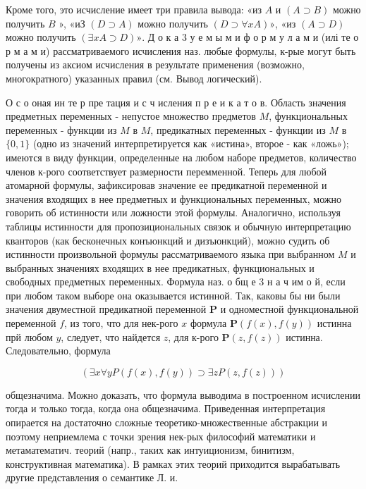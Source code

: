 \documentclass[10pt]{article}
\begin{document}
Кроме того, это исчисление имеет три правила вывода: «из $A$ и $(A \supset B)$ можно получить $B$ », «иЗ $(D \supset A)$ можно получить $(D \supset \forall x A) »$, «из $(A \supset D)$ можно получить $(\exists x A \supset D) »$. Д о к а 3 у е м ы м и ф о р м у л а м и (илі те о р м а м и) рассматриваемого исчисления наз. любые формулы, к-рые могут быть получены из аксиом исчисления в результате применения (возможно, многократного) указанных правил (см. Вывод логический).



О с о оная ин те р пре тация и с ч исления п р е и к а т о в. Область значения предметных переменных - непустое множество предметов $M$, функциональных переменных - функции из $M$ в $M$, предикатных переменных - функции из $M$ в $\{0,1\}$ (одно из значений интерпретируется как «истина», второе - как «ложь»); имеются в виду функции, определенные на любом наборе предметов, количество членов к-рого соответствует размерности перемменной. Теперь для любой атомарной формулы, зафиксировав значение ее предикатной переменной и значения входящих в нее предметных и функциональных переменных, можно говорить об истинности или ложности этой формулы. Аналогично, используя таблицы истинности для пропозициональных связок и обычную интерпретацию кванторов (как бесконечных конъюнкций и дизъюнкций), можно судить об истинности произвольной формулы рассматриваемого языка при выбранном $M$ и выбранных значениях входящих в нее предикатных, функциональных и свободных предметных переменных. Формула наз. о бщ е 3 н а ч им о й, если при любом таком выборе она оказывается истинной. Так, каковы бы ни были значения двуместной предикатной переменной $\boldsymbol{P}$ и одноместной функциональной переменной $f$, из того, что для нек-рого $x$ формула $\boldsymbol{P}(f(x), f(y))$ истинна прй любом $y$, следует, что найдется $z$, для к-рого $\boldsymbol{P}(z, f(z))$ истинна. Следовательно, формула



\[

(\exists x \forall y P(f(x), f(y)) \supset \exists z P(z, f(z)))

\]



общезначима. Можно доказать, что формула выводима в построенном исчислении тогда и только тогда, когда она общезначима. Приведенная интерпретация опирается на достаточно сложные теоретико-множественные абстракции и поэтому неприемлема с точки зрения нек-рых философий математики и метаматематич. теорий (напр., таких как интуиционизм, бинитизм, конструктивная математика). В рамках этих теорий приходится вырабатывать другие представления о семантике Л. и.
\end{document}
